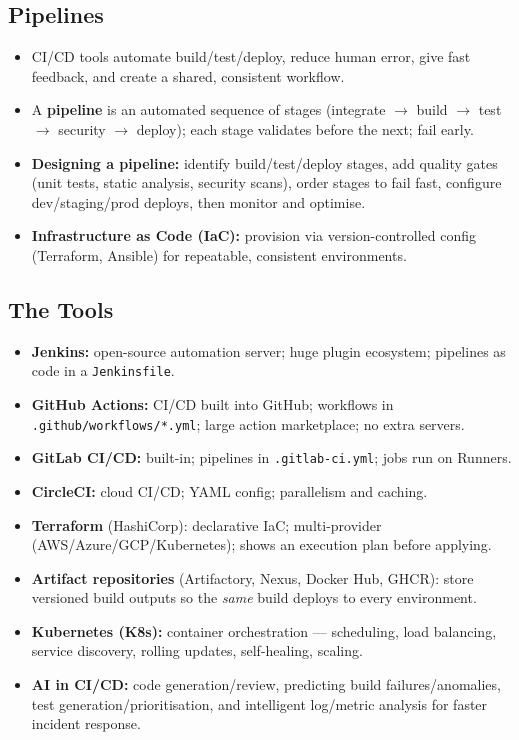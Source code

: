 \documentclass[hidelinks]{article}
\begin{document}
\subsection{Pipelines}
\begin{itemize}
  \item CI/CD tools automate build/test/deploy, reduce human error, give fast feedback, and create
        a shared, consistent workflow.
  \item A \textbf{pipeline} is an automated sequence of stages (integrate $\to$ build $\to$ test
        $\to$ security $\to$ deploy); each stage validates before the next; fail early.
  \item \textbf{Designing a pipeline:} identify build/test/deploy stages, add quality gates
        (unit tests, static analysis, security scans), order stages to fail fast, configure
        dev/staging/prod deploys, then monitor and optimise.
  \item \textbf{Infrastructure as Code (IaC):} provision via version-controlled config (Terraform,
        Ansible) for repeatable, consistent environments.
\end{itemize}

\subsection{The Tools}
\begin{itemize}
  \item \textbf{Jenkins:} open-source automation server; huge plugin ecosystem; pipelines as code
        in a \texttt{Jenkinsfile}.
  \item \textbf{GitHub Actions:} CI/CD built into GitHub; workflows in
        \texttt{.github/workflows/*.yml}; large action marketplace; no extra servers.
  \item \textbf{GitLab CI/CD:} built-in; pipelines in \texttt{.gitlab-ci.yml}; jobs run on Runners.
  \item \textbf{CircleCI:} cloud CI/CD; YAML config; parallelism and caching.
  \item \textbf{Terraform} (HashiCorp): declarative IaC; multi-provider (AWS/Azure/GCP/Kubernetes);
        shows an execution plan before applying.
  \item \textbf{Artifact repositories} (Artifactory, Nexus, Docker Hub, GHCR): store versioned
        build outputs so the \emph{same} build deploys to every environment.
  \item \textbf{Kubernetes (K8s):} container orchestration --- scheduling, load balancing, service
        discovery, rolling updates, self-healing, scaling.
  \item \textbf{AI in CI/CD:} code generation/review, predicting build failures/anomalies, test
        generation/prioritisation, and intelligent log/metric analysis for faster incident response.
\end{itemize}
\end{document}
